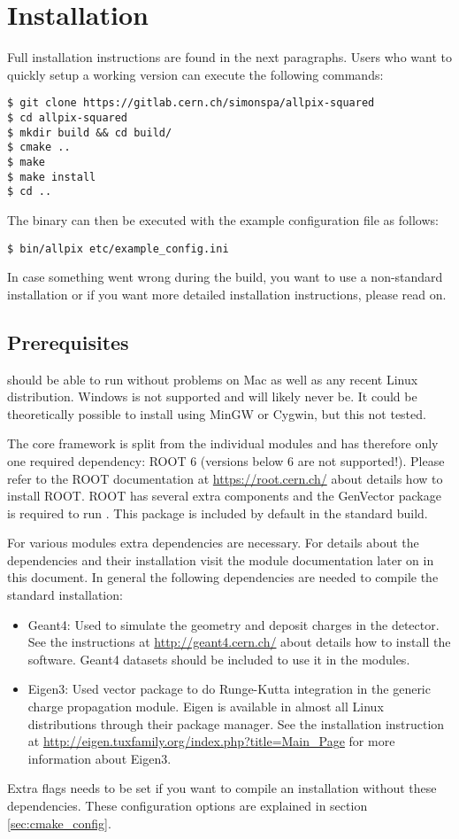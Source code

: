 \section{Installation}
Full installation instructions are found in the next paragraphs. Users who want to quickly setup a working version can execute the following commands:
\begin{verbatim}
$ git clone https://gitlab.cern.ch/simonspa/allpix-squared
$ cd allpix-squared
$ mkdir build && cd build/
$ cmake ..
$ make
$ make install
$ cd ..
\end{verbatim}
The binary can then be executed with the example configuration file as follows:
\begin{verbatim}
$ bin/allpix etc/example_config.ini
\end{verbatim}

In case something went wrong during the build, you want to use a non-standard installation or if you want more detailed installation instructions, please read on.
\subsection{Prerequisites}
\apsq should be able to run without problems on Mac as well as any recent Linux distribution. Windows is not supported and will likely never be. It could be theoretically possible to install \apsq using MinGW or Cygwin, but this not tested.

The core framework is split from the individual modules and \apsq has therefore only one required dependency: ROOT 6 (versions below 6 are not supported!). Please refer to the ROOT documentation at \url{https://root.cern.ch/} about details how to install ROOT. ROOT has several extra components and the GenVector package is required to run \apsq. This package is included by default in the standard build.

For various modules extra dependencies are necessary. For details about the dependencies and their installation visit the module documentation later on in this document. In general the following dependencies are needed to compile the standard installation:
\begin{itemize}
\item Geant4: Used to simulate the geometry and deposit charges in the detector. See the instructions at \url{http://geant4.cern.ch/} about details how to install the software. Geant4 datasets should be included to use it in the modules.
\item Eigen3: Used vector package to do Runge-Kutta integration in the generic charge propagation module. Eigen is available in almost all Linux distributions through their package manager. See the installation instruction at \url{http://eigen.tuxfamily.org/index.php?title=Main_Page} for more information about Eigen3.
\end{itemize}
Extra flags needs to be set if you want to compile an \apsq installation without these dependencies. These configuration options are explained in section \ref{sec:cmake_config}.


